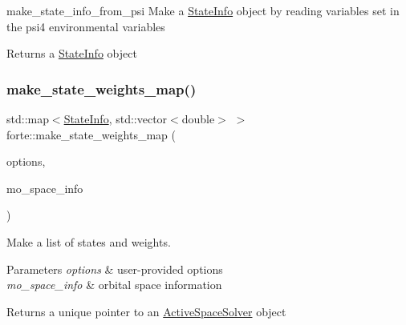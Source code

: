 make\+\_\+state\+\_\+info\+\_\+from\+\_\+psi Make a \mbox{\hyperlink{classforte_1_1_state_info}{State\+Info}} object by reading variables set in the psi4 environmental variables 

\begin{DoxyReturn}{Returns}
a \mbox{\hyperlink{classforte_1_1_state_info}{State\+Info}} object 
\end{DoxyReturn}
\mbox{\label{namespaceforte_a60e6d8ce86b74af883bf44cc4ba7b91d}} 
\subsubsection{\texorpdfstring{make\+\_\+state\+\_\+weights\+\_\+map()}{make\_state\_weights\_map()}\hspace{0.1cm}{\footnotesize\ttfamily [1/2]}}
{\footnotesize\ttfamily std\+::map$<$\mbox{\hyperlink{classforte_1_1_state_info}{State\+Info}}, std\+::vector$<$double$>$ $>$ forte\+::make\+\_\+state\+\_\+weights\+\_\+map (\begin{DoxyParamCaption}\item[{std\+::shared\+\_\+ptr$<$ \mbox{\hyperlink{classforte_1_1_forte_options}{Forte\+Options}} $>$}]{options,  }\item[{std\+::shared\+\_\+ptr$<$ \mbox{\hyperlink{classforte_1_1_m_o_space_info}{forte\+::\+M\+O\+Space\+Info}} $>$}]{mo\+\_\+space\+\_\+info }\end{DoxyParamCaption})}



Make a list of states and weights. 


\begin{DoxyParams}{Parameters}
{\em options} & user-\/provided options \\
\hline
{\em mo\+\_\+space\+\_\+info} & orbital space information \\
\hline
\end{DoxyParams}
\begin{DoxyReturn}{Returns}
a unique pointer to an \mbox{\hyperlink{classforte_1_1_active_space_solver}{Active\+Space\+Solver}} object 
\end{DoxyReturn}
\mbox{\label{namespaceforte_aefa9187be6c8b4f5f807acb9370094b9}} 
